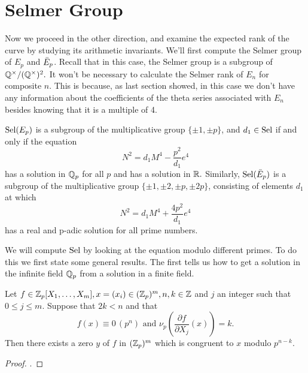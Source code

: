 \documentclass[12pt, a4paper]{report}
\begin{document}
\section{Selmer Group}

Now we proceed in the other direction, and examine the expected rank of the
curve by studying its arithmetic invariants. We'll first compute the Selmer
group of $E_p$ and $\bar{E}_p$. Recall that in this case, the Selmer group is a
subgroup of ${\mathbb Q}^\times / ({\mathbb Q}^\times)^2.$ It won't be necessary to calculate
the Selmer rank of $E_n$ for composite $n$. This is because, as last section showed, in
this case we don't have any information about the coefficients of the theta
series associated with $E_n$ besides
knowing that it is a multiple of 4.

\begin{prop}
  $\text{\normalfont Sel}(E_p)$ is a subgroup of the multiplicative group
  $ \{ \pm 1, \pm p \}$, and $d_1 \in \text{\normalfont Sel}$ if and only if the equation
  \begin{equation} \label{eq:hom}
    N^2 = d_1 M^4 - \frac{p^2}{d_1}e^4
  \end{equation}
  has a solution in ${\mathbb Q}_p$ for all $p$ and has a solution in ${\mathbb R}.$
  Similarly, $\text{\normalfont Sel}(\bar{E}_p)$ is a subgroup of the multiplicative group
  $\{\pm 1, \pm 2, \pm p, \pm 2p\}$,
  consisting of elements $d_1$ at which
  \begin{equation}
    N^2 = d_1 M^4 + \frac{4p^2}{d_1}e^4 \label{eq:isohom}
  \end{equation}
  has a real and p-adic
  solution for all prime numbers.
\end{prop}

We will compute $\text{\normalfont Sel}$ by looking at the equation modulo different primes.
To do this we first state some general results. The first tells us
how to get a solution in the infinite field ${\mathbb Q}_p$ from a solution in a finite
field.

\begin{prop}
  Let $f \in {\mathbb Z}_p[X_1,\dots,X_m], x = (x_i) \in ({\mathbb Z}_p)^m, n, k \in {\mathbb Z}$ and
  $j$ an integer such that $0 \leq j \leq m$. Suppose that $2k < n$ and that
  \[ f(x) \equiv 0 \, (p^n) \text { and } \nu_p
    \left(\frac{\partial f}{\partial X_j} (x) \right) = k.\]
  Then there exists a zero $y$ of $f$ in $({\mathbb Z}_p)^m$ which is congruent to $x$
  modulo $p^{n-k}$.
\end{prop}
\begin{proof}
  \cite[See][Chapter 2-2, page 14]{Serre}.
\end{proof}
\end{document}
